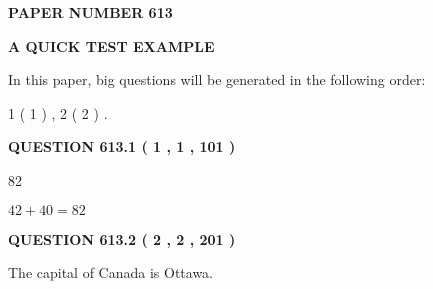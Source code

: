 \documentclass[12pt]{article}
\begin{document}
   
   
   
\newpage 
\setcounter{page}{ 
   613001 } 
   
   
   
   
 {\textbf{ \Large{ PAPER NUMBER  613  }}}
   
   
\vspace{0.2in}
   
   
   
   
   
   
 \vspace{0.2in}
{\LARGE {\textbf{ A QUICK TEST EXAMPLE}}}
   
   
   
\vspace{0.2in}
   
In this paper, big questions will be generated in the following order: 
   
   
   1 ( 1 )
 ,
   2 ( 2 )
 .
  
\vspace{0.2in}
  
{\textbf{\Large{QUESTION
613.1 
 ( 1 , 1 , 101 )
}}}
  
  
 
 
\noindent{}

82
 
 
 
 
\noindent{}

$ %
42 +  %
40=   %
82$
 
 
  
\vspace{0.2in}
  
{\textbf{\Large{QUESTION
613.2 
 ( 2 , 2 , 201 )
}}}
  
  
 
 
\noindent{}
 
 
The capital of Canada is Ottawa.
 
 
 
 
   
   
 \vspace{0.2in}
 
   
   
   
   
\end{document}
